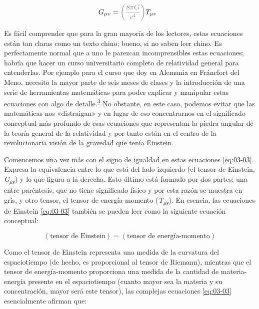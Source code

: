 \begin{equation}\label{eq:03-03}
G_{\mu\upsilon} = \textcolor{gray}{\left( \frac{8\pi G}{c^{4}} \right)}T_{\mu\upsilon\ \ }
\end{equation}

Es fácil comprender que para la gran mayoría de los lectores, estas ecuaciones están tan claras
como un texto chino; bueno, si no saben leer chino. Es perfectamente normal que a uno le
parezcan incomprensibles estas ecuaciones; habría que hacer un curso universitario completo de
relatividad general para entenderlas. Por ejemplo para el curso que doy en Alemania en
Fráncfort del Meno, necesito la mayor parte de seis meses de clases y la introducción de una
serie de herramientas matemáticas para poder explicar y manipular estas ecuaciones con algo de
detalle.\textsuperscript{\hyperlink{note:03-03}{3}} No obstante, en este caso, podemos evitar
que las matemáticas nos «distraigan» y en lugar de eso concentrarnos en el significado
conceptual más profundo de esas ecuaciones que representan la piedra angular de la teoría
general de la relatividad y por tanto están en el centro de la revolucionaria visión de la
gravedad que tenía Einstein.

Comencemos una vez más con el signo de igualdad en estas ecuaciones \eqref{eq:03-03}. Expresa
la equivalencia entre lo que está del lado izquierdo (el tensor de Einstein,
\emph{G\textsubscript{µν}}) y lo que figura a la derecha. Esto último está formado por dos
partes: una entre paréntesis, que no tiene significado físico y por esta razón se muestra en
gris, y otro tensor, el tensor de energía-momento (\emph{T\textsubscript{µν}}). En esencia, las
ecuaciones de Einstein \eqref{eq:03-03} también se pueden leer como la siguiente ecuación
conceptual:

\begin{equation}\label{eq:03-04}
(\text{tensor de Einstein}) = (\text{tensor de energía-momento})
\end{equation}


Como el tensor de Einstein representa una medida de la curvatura del espaciotiempo (de hecho,
es proporcional al tensor de Riemann), mientras que el tensor de energía-momento proporciona
una medida de la cantidad de materia-energía presente en el espaciotiempo (cuanto mayor sea la
materia y su concentración, mayor será este tensor), las complejas ecuaciones \eqref{eq:03-03}
esencialmente afirman que:

